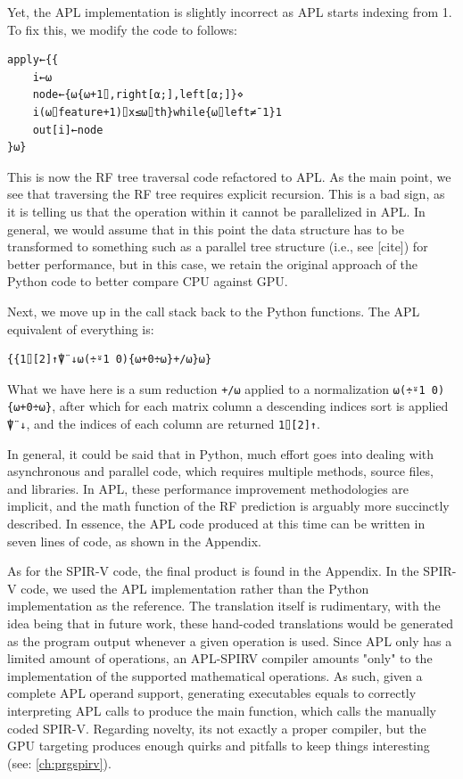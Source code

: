 \documentclass{IEEEtran}
\begin{document}
Yet, the APL implementation is slightly incorrect as APL starts indexing from 1. To fix this, we modify the code to follows:

{\aplfont\begin{verbatim}
apply←{{
    i←⍵
    node←{⍵{⍵+1⌷,right[⍺;],left[⍺;]}⋄
    i(⍵⌷feature+1)⌷x≤⍵⌷th}while{⍵⌷left≠¯1}1
    out[i]←node
}⍵}
\end{verbatim}}

This is now the RF tree traversal code refactored to APL. As the main point, we see that traversing the RF tree requires explicit recursion. This is a bad sign, as it is telling us that the operation within it cannot be parallelized in APL. In general, we would assume that in this point the data structure has to be transformed to something such as a parallel tree structure (i.e., see [cite]) for better performance, but in this case, we retain the original approach of the Python code to better compare CPU against GPU.

Next, we move up in the call stack back to the Python functions. The APL equivalent of everything is:

{\aplfont\begin{verbatim}
{{1⌷[2]↑⍒¨↓⍵(÷⍤1 0){⍵+0÷⍵}+/⍵}⍵}
\end{verbatim}}

What we have here is a sum reduction \verb|+/⍵| applied to a normalization \verb|⍵(÷⍤1 0){⍵+0÷⍵}|, after which for each matrix column a descending indices sort is applied \verb|⍒¨↓|, and the indices of each column are returned \verb|1⌷[2]↑|.

In general, it could be said that in Python, much effort goes into dealing with asynchronous and parallel code, which requires multiple methods, source files, and libraries. In APL, these performance improvement methodologies are implicit, and the math function of the RF prediction is arguably more succinctly described. In essence, the APL code produced at this time can be written in seven lines of code, as shown in the Appendix. 

As for the SPIR-V code, the final product is found in the Appendix. In the SPIR-V code, we used the APL implementation rather than the Python implementation as the reference. The translation itself is rudimentary, with the idea being that in future work, these hand-coded translations would be generated as the program output whenever a given operation is used. Since APL only has a limited amount of operations, an APL-SPIRV compiler amounts "only" to the implementation of the supported mathematical operations. As such, given a complete APL operand support, generating executables equals to correctly interpreting APL calls to produce the main function, which calls the manually coded SPIR-V. Regarding novelty, its not exactly a proper compiler, but the GPU targeting produces enough quirks and pitfalls to keep things interesting (see: \ref{ch:prgspirv}).
\end{document}
